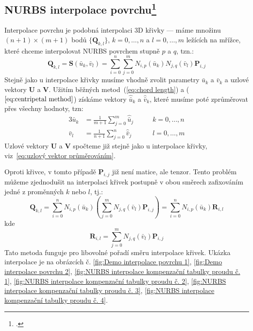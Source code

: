 \subsection[NURBS interpolace povrchu]{NURBS interpolace povrchu\footcite[kapitola 9.2.5]{The_NURBS_Book}}\label{sec:NURBS interpolace povrchu}
Interpolace povrchu je podobná interpolaci 3D křivky --- máme množinu $(n + 1)
    \times (m + 1)$ bodů $\{\bm{Q}_{k,l}\}$, $k=0,\ldots,n$ a $l=0,\ldots,m$ ležících na mřížce, které
chceme interpolovat NURBS povrchem stupně $p$ a $q$, tzn.:
\begin{equation}
    \bm{Q}_{k,l} = \bm{S}(\bar{u}_k, \bar{v}_l) = \sum_{i=0}^{n}\sum_{j=0}^{m}
    N_{i,p}(\bar{u}_k)N_{j,q}(\bar{v}_l)\bm{P}_{i,j}
\end{equation}
Stejně jako u interpolace křivky musíme vhodně zvolit parametry $\bar{u}_k$ a $\bar{v}_k$
a uzlové vektory $\bm{U}$ a $\bm{V}$.
Užitím běžných metod~(\ref{eq:chord length}) a ($\ref{eq:centripetal method}$) získáme
vektory $\hat{\bar{u}}_k$ a $\hat{\bar{v}}_k$, které musíme poté
zprůměrovat přes všechny hodnoty, tzn:
\begin{alignat}{3}
    \bar{u}_k & = \frac{1}{m + 1}\sum_{j=0}^{m}\hat{\bar{u}}_j \quad\quad & k =0,\ldots,n \\
    \bar{v}_l & = \frac{1}{n + 1}\sum_{j=0}^{n}\hat{\bar{v}}_j\quad\quad  & l =0,\ldots,m
\end{alignat}
Uzlové vektory $\bm{U}$ a $\bm{V}$ spočteme již stejně jako u interpolace křivky,
viz~\ref{eq:uzlový vektor průměrováním}.\par
Oproti křivce, v tomto případě $\bm{P}_{i,j}$ již není matice, ale tenzor. Tento problém můžeme
zjednodušit na interpolaci křivek postupně v obou směrech
zafixováním jedné z proměnných $k$ nebo $l$, tj.:
\begin{equation}
    \bm{Q}_{k,l} =\sum_{i=0}^{n}N_{i,p}(\bar{u}_k)
    \left(\sum_{j=0}^{m}N_{j,q}(\bar{v}_l)\bm{P}_{i,j}\right)
    =\sum_{i=0}^{n}N_{i,p}(\bar{u}_k)\bm{R}_{i,l}
\end{equation}
kde \begin{equation}
    \bm{R}_{i,l} = \sum_{j=0}^{m}N_{j,q}(\bar{v}_l)\bm{P}_{i,j}
\end{equation}
Tato metoda funguje pro libovolné pořadí směru interpolace křivek.
Ukázka interpolace je na obrázcích č. \ref{fig:Demo interpolace povrchu 1}, \ref{fig:Demo interpolace povrchu 2},
\ref{fig:NURBS interpolace kompenzační tabulky proudu č. 1},
\ref{fig:NURBS interpolace kompenzační tabulky proudu č. 2},
\ref{fig:NURBS interpolace kompenzační tabulky proudu č. 3},
\ref{fig:NURBS interpolace kompenzační tabulky proudu č. 4}.

